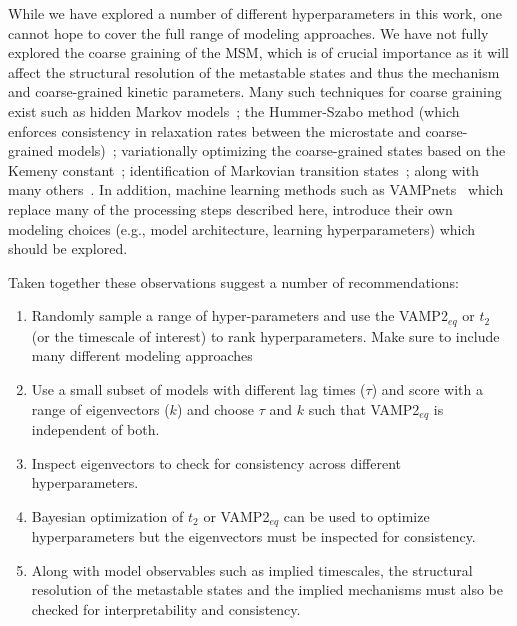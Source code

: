 \documentclass[journal=jacsat,manuscript=article]{achemso}
\begin{document}
While we have explored a number of different hyperparameters in this work, one cannot hope to cover the full range of modeling approaches. We have not fully explored the coarse graining of the MSM, which is of crucial importance as it will affect the structural resolution of the metastable states and thus the mechanism and coarse-grained kinetic parameters.  Many such techniques for coarse graining exist such as hidden Markov models~\cite{noeProjectedHiddenMarkov2013a}; the Hummer-Szabo method (which enforces consistency in relaxation rates between the microstate and coarse-grained models)~\cite{hummerOptimalDimensionalityReduction2015}; variationally optimizing the coarse-grained states based on the Kemeny constant~\cite{koskinVariationalKineticClustering2023}; identification of Markovian transition states~\cite{martiniVariationalIdentificationMarkovian2017}; along with many others~\cite{orioliDimensionalReductionMarkov2016, jainIdentifyingMetastableStates2012, bowmanImprovedCoarsegrainingMarkov2012}.  In addition, machine learning methods such as VAMPnets~\cite{VAMPnets_f2018} which replace many of the processing steps described here, introduce their own modeling choices (e.g., model architecture, learning hyperparameters) which should be explored.  

Taken together these observations suggest a number of recommendations: 

\begin{enumerate}
    \item Randomly sample a range of hyper-parameters and use the VAMP2$_{eq}$ or $t_2$ (or the timescale of interest) to rank hyperparameters. Make sure to include many different modeling approaches
    \item Use a small subset of models with different lag times ($\tau$) and score with a range of eigenvectors ($k$) and choose $\tau$ and $k$ such that VAMP2$_{eq}$ is independent of both.  
    \item Inspect eigenvectors to check for consistency across different hyperparameters. 
    \item Bayesian optimization of $t_2$ or VAMP2$_{eq}$ can be used to optimize hyperparameters but the eigenvectors must be inspected for consistency.  
    \item Along with model observables such as implied timescales, the structural resolution of the metastable states and the implied mechanisms must also be checked for interpretability and consistency. 
\end{enumerate}
\end{document}
